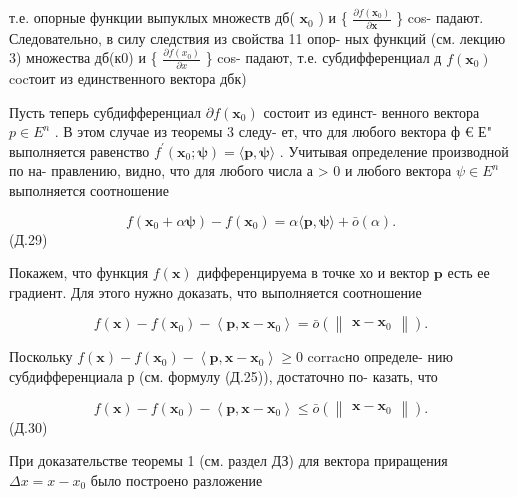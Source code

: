\documentclass[8pt]{extarticle}
\begin{document}
т.е. опорные функции выпуклых множеств дб( \({\mathbf{x}}_{0}\) ) и \{ \(\frac{\partial f\left( {\mathbf{x}}_{0}\right) }{\partial \mathbf{x}}\) \} cos- падают. Следовательно, в силу следствия из свойства 11 опор- ных функций (см. лекцию 3) множества дб(к0) и \{ \(\frac{\partial f\left( {x}_{0}\right) }{\partial x}\) \} cos- падают, т.е. субдифференциал д \(f\left( {\mathbf{x}}_{0}\right)\) cocтоит из единственного вектора дбк)

Пусть теперь субдифференциал \(\partial f\left( {\mathbf{x}}_{0}\right)\) состоит из единст- венного вектора \(p \in  {E}^{n}\) . В этом случае из теоремы 3 следу- ет, что для любого вектора ф € Е" выполняется равенство \({f}^{\prime }\left( {{\mathbf{x}}_{0};\mathbf{\psi }}\right)  = \langle \mathbf{p},\mathbf{\psi }\rangle\) . Учитывая определение производной по на- правлению, видно, что для любого числа а > 0 и любого вектора \(\psi  \in  {E}^{n}\) выполняется соотношение

\[
f\left( {{\mathbf{x}}_{0} + \alpha \mathbf{\psi }}\right)  - f\left( {\mathbf{x}}_{0}\right)  = \alpha \langle \mathbf{p},\mathbf{\psi }\rangle  + \bar{o}\left( \alpha \right) .
\]
 (Д.29)

Покажем, что функция \(f\left( \mathbf{x}\right)\) дифференцируема в точке хо и вектор \(\mathbf{p}\) есть ее градиент. Для этого нужно доказать, что выполняется соотношение

\[
f\left( \mathbf{x}\right)  - f\left( {\mathbf{x}}_{0}\right)  - \left\langle  {\mathbf{p},\mathbf{x} - {\mathbf{x}}_{0}}\right\rangle   = \bar{o}\left( \left\lVert \begin{array}{c} {\mathbf{x} - {\mathbf{x}}_{0}} \end{array} \right\rVert\right) .
\]

Поскольку \(f\left( \mathbf{x}\right)  - f\left( {\mathbf{x}}_{0}\right)  - \left\langle  {\mathbf{p},\mathbf{x} - {\mathbf{x}}_{0}}\right\rangle   \geq  0\) corracно определе- нию субдифференциала р (см. формулу (Д.25)), достаточно по- казать, что

\[
f\left( \mathbf{x}\right)  - f\left( {\mathbf{x}}_{0}\right)  - \left\langle  {\mathbf{p},\mathbf{x} - {\mathbf{x}}_{0}}\right\rangle   \leq  \bar{o}\left( \left\lVert \begin{array}{c} {\mathbf{x} - {\mathbf{x}}_{0}} \end{array} \right\rVert\right) .
\]
 (Д.30)

При доказательстве теоремы 1 (см. раздел ДЗ) для вектора приращения \({\Delta x} = x - {x}_{0}\) было построено разложение
\end{document}
